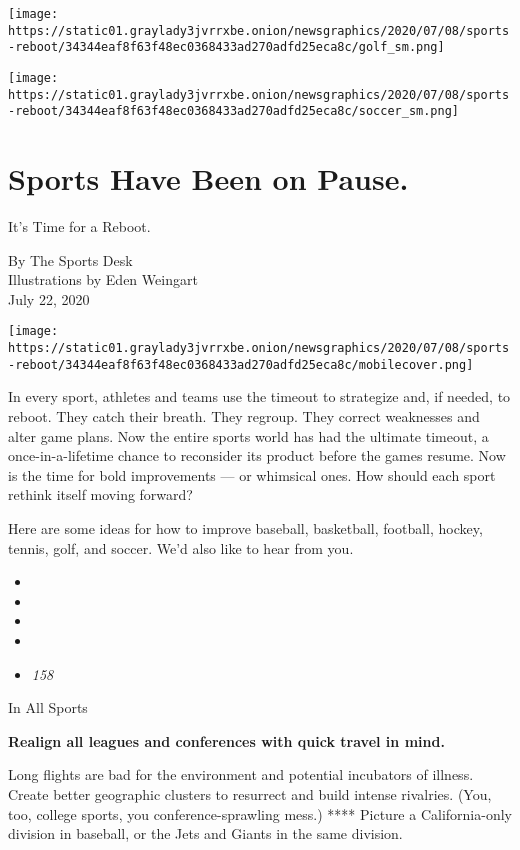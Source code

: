 \texttt{[image: https://static01.graylady3jvrrxbe.onion/newsgraphics/2020/07/08/sports-reboot/34344eaf8f63f48ec0368433ad270adfd25eca8c/golf\_sm.png]}

\texttt{[image: https://static01.graylady3jvrrxbe.onion/newsgraphics/2020/07/08/sports-reboot/34344eaf8f63f48ec0368433ad270adfd25eca8c/soccer\_sm.png]}

\hypertarget{sports-have-been-on-pause}{%
\section{Sports Have Been on Pause.}\label{sports-have-been-on-pause}}

It's Time for a Reboot.

By The Sports Desk\\
Illustrations by Eden Weingart\\
July 22, 2020

\texttt{[image: https://static01.graylady3jvrrxbe.onion/newsgraphics/2020/07/08/sports-reboot/34344eaf8f63f48ec0368433ad270adfd25eca8c/mobilecover.png]}

In every sport, athletes and teams use the timeout to strategize and, if
needed, to reboot. They catch their breath. They regroup. They correct
weaknesses and alter game plans. Now the entire sports world has had the
ultimate timeout, a once-in-a-lifetime chance to reconsider its product
before the games resume. Now is the time for bold improvements --- or
whimsical ones. How should each sport rethink itself moving forward?

Here are some ideas for how to improve baseball, basketball, football,
hockey, tennis, golf, and soccer. We'd also like to hear from you.

\begin{itemize}
\item
\item
\item
\item
\item
  \emph{158}
\end{itemize}

In All Sports

\textbf{Realign all leagues and conferences with quick travel in mind.}

Long flights are bad for the environment and potential incubators of
illness. Create better geographic clusters to resurrect and build
intense rivalries. (You, too, college sports, you conference-sprawling
mess.) **** Picture a California-only division in baseball, or the Jets
and Giants in the same division.

